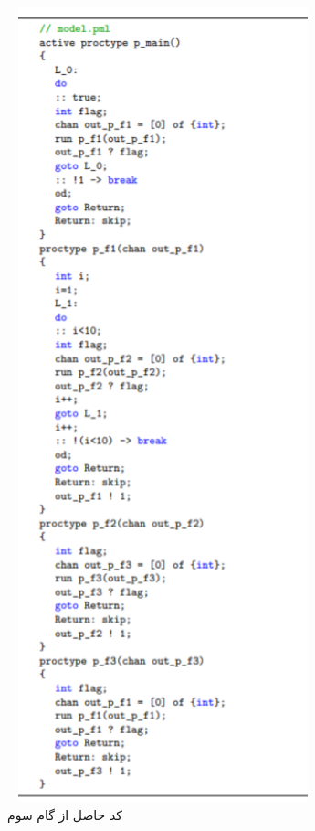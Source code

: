 \begin{figure}
	\centering
	\includegraphics[height=23cm,width=9cm]{k.png}
	\caption{کد حاصل از گام سوم}
	\centering
\end{figure}


